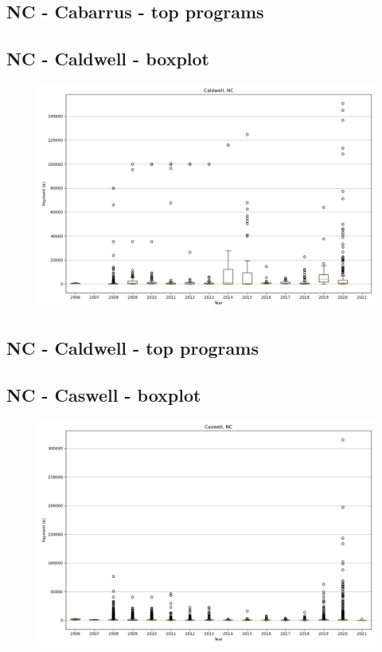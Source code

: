\subsection*{NC - Cabarrus - top programs}

\newpage
\subsection*{NC - Caldwell - boxplot}
\begin{figure}[h]
\centering
\includegraphics[width=7in]{../output/boxplots/counties/Caldwell-NC_boxplot.png}
\end{figure}


\subsection*{NC - Caldwell - top programs}

\newpage
\subsection*{NC - Caswell - boxplot}
\begin{figure}[h]
\centering
\includegraphics[width=7in]{../output/boxplots/counties/Caswell-NC_boxplot.png}
\end{figure}


